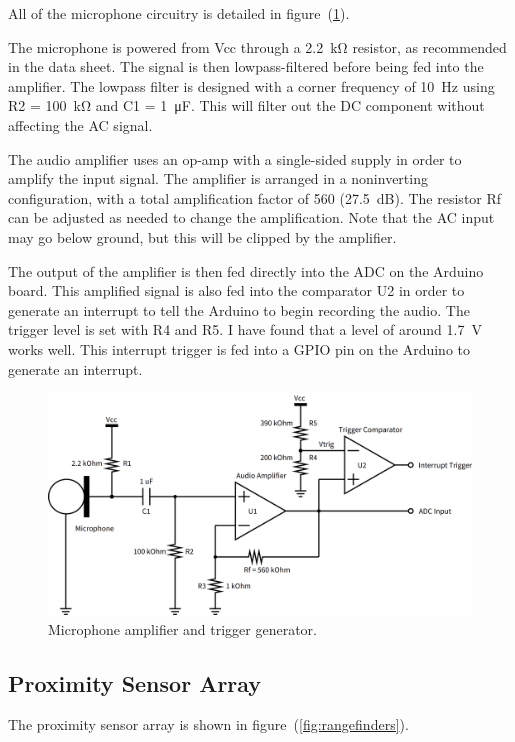 \documentclass[10pt]{article}           %
\begin{document}
All of the microphone circuitry is detailed in figure~(\ref{fig:microphone}).

The microphone is powered from Vcc through a \SI{2.2}{\kilo\ohm} resistor,
as recommended in the data sheet. The signal is then lowpass-filtered before
being fed into the amplifier. The lowpass filter is designed with a corner
frequency of \SI{10}{\hertz} using R2 = \SI{100}{\kilo\ohm} and C1 =
\SI{1}{\micro\farad}. This will filter out the DC component without affecting
the AC signal.

The audio amplifier uses an op-amp with a single-sided supply in order to
amplify the input signal. The amplifier is arranged in a noninverting
configuration, with a total amplification factor of 560 (\SI{27.5}{\deci\bel}).
The resistor Rf can be adjusted as needed to change the amplification. Note
that the AC input may go below ground, but this will be clipped by the
amplifier.

The output of the amplifier is then fed directly into the ADC on the Arduino
board. This amplified signal is also fed into the comparator U2 in order to
generate an interrupt to tell the Arduino to begin recording the audio. The
trigger level is set with R4 and R5. I have found that a level of around
\SI{1.7}{\volt} works well. This interrupt trigger is fed into a GPIO pin on the
Arduino to generate an interrupt.

\begin{figure}[h]
    \centering
    \includegraphics[width=0.8\linewidth]{sch/microphone.png}
    \caption{Microphone amplifier and trigger generator.}
\label{fig:microphone}
\end{figure}

\subsection{Proximity Sensor Array}
\label{sub:proximity_sensor_array}

The proximity sensor array is shown in figure~(\ref{fig:rangefinders}).
\end{document}
